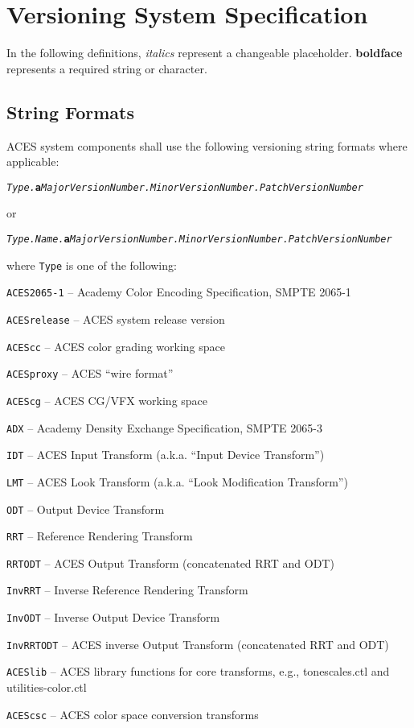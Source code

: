 \regularsectionformat
\chapter{Versioning System Specification}
In the following definitions, \textit{italics} represent a changeable placeholder. \textbf{boldface} represents a required string or character.

\section{String Formats}
ACES system components shall use the following versioning string formats where applicable:

\texttt{\textit{Type.}\textbf{a}\textit{MajorVersionNumber.MinorVersionNumber.PatchVersionNumber}}

or

\texttt{\textit{Type.Name.}\textbf{a}\textit{MajorVersionNumber.MinorVersionNumber.PatchVersionNumber}}

where \texttt{Type} is one of the following:

\begin{listize}
    \item \texttt{ACES2065-1} -- Academy Color Encoding Specification, SMPTE 2065-1
    \item \texttt{ACESrelease} -- ACES system release version
    \item \texttt{ACEScc} -- ACES color grading working space
    \item \texttt{ACESproxy} -- ACES ``wire format''
    \item \texttt{ACEScg} -- ACES CG/VFX working space
    \item \texttt{ADX} -- Academy Density Exchange Specification, SMPTE 2065-3
    \item \texttt{IDT} -- ACES Input Transform (a.k.a. ``Input Device Transform'')
    \item \texttt{LMT} -- ACES Look Transform (a.k.a. ``Look Modification Transform'')
    \item \texttt{ODT} -- Output Device Transform
    \item \texttt{RRT} -- Reference Rendering Transform
    \item \texttt{RRTODT} -- ACES Output Transform (concatenated RRT and ODT)
    \item \texttt{InvRRT} -- Inverse Reference Rendering Transform
    \item \texttt{InvODT} -- Inverse Output Device Transform
    \item \texttt{InvRRTODT} -- ACES inverse Output Transform (concatenated RRT and ODT)
    \item \texttt{ACESlib} -- ACES library functions for core transforms, e.g., tonescales.ctl and utilities-color.ctl
    \item \texttt{ACEScsc} -- ACES color space conversion transforms
\end{listize}

